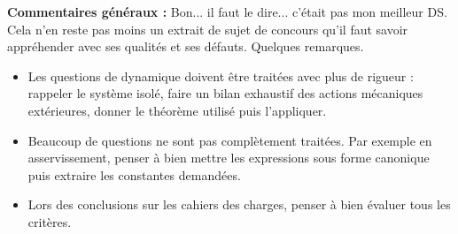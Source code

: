 \documentclass[10pt,fleqn]{article} %
\begin{document}

\pagestyle{fancy}
\thispagestyle{plain}


\def\columnseprulecolor{\color{ocre}}
\setlength{\columnseprule}{0.4pt} 



\vspace{6cm}
\textbf{Commentaires généraux : }
Bon... il faut le dire... c'était pas mon meilleur DS. Cela n'en reste pas moins un extrait de sujet de concours qu'il faut savoir appréhender avec ses qualités et ses défauts. Quelques remarques. 
\begin{itemize}
\item Les questions de dynamique doivent être traitées avec plus de rigueur : rappeler le système isolé, faire un bilan exhaustif des actions mécaniques extérieures, donner le théorème utilisé puis l'appliquer.
\item Beaucoup de questions ne sont pas complètement traitées. Par exemple en asservissement, penser à bien mettre les expressions sous forme canonique puis extraire les constantes demandées. 
\item Lors des conclusions sur les cahiers des charges, penser à bien évaluer tous les critères.
\end{itemize}






\end{document}
